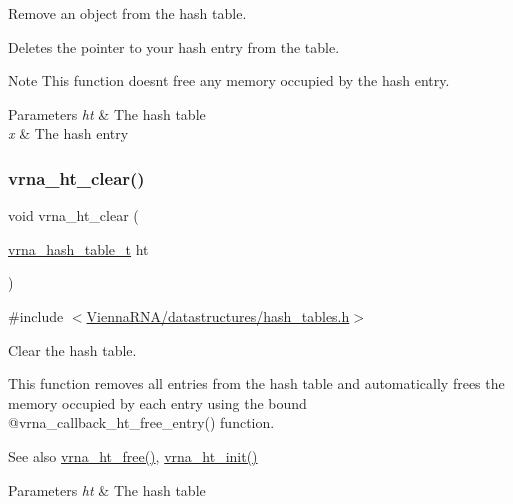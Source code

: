Remove an object from the hash table. 

Deletes the pointer to your hash entry from the table.

\begin{DoxyNote}{Note}
This function doesn\textquotesingle{}t free any memory occupied by the hash entry.
\end{DoxyNote}

\begin{DoxyParams}{Parameters}
{\em ht} & The hash table \\
\hline
{\em x} & The hash entry \\
\hline
\end{DoxyParams}
\mbox{\label{group__hash__table__utils_gab90583f8f7395e735c865ad2ebdb3c29}} 
\subsubsection{\texorpdfstring{vrna\_ht\_clear()}{vrna\_ht\_clear()}}
{\footnotesize\ttfamily void vrna\+\_\+ht\+\_\+clear (\begin{DoxyParamCaption}\item[{\mbox{\hyperlink{group__hash__table__utils_gabc7c6f41b718c8e23929e528891a89c4}{vrna\+\_\+hash\+\_\+table\+\_\+t}}}]{ht }\end{DoxyParamCaption})}



{\ttfamily \#include $<$\mbox{\hyperlink{hash__tables_8h}{Vienna\+R\+N\+A/datastructures/hash\+\_\+tables.\+h}}$>$}



Clear the hash table. 

This function removes all entries from the hash table and automatically free\textquotesingle{}s the memory occupied by each entry using the bound @vrna\+\_\+callback\+\_\+ht\+\_\+free\+\_\+entry() function.

\begin{DoxySeeAlso}{See also}
\mbox{\hyperlink{group__hash__table__utils_ga479db024c70437aa2576d60b373c5262}{vrna\+\_\+ht\+\_\+free()}}, \mbox{\hyperlink{group__hash__table__utils_ga37d1c7e13087a2b7c1b87fda34577c29}{vrna\+\_\+ht\+\_\+init()}}
\end{DoxySeeAlso}

\begin{DoxyParams}{Parameters}
{\em ht} & The hash table \\
\hline
\end{DoxyParams}
\mbox{\label{group__hash__table__utils_ga479db024c70437aa2576d60b373c5262}} 
